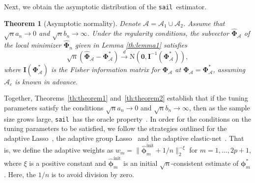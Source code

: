 \documentclass[a4paper,fleqn]{cas-sc}
\newtheorem{theorem}{Theorem}
\newcommand{\sail}{\texttt{sail}}
\newcommand{\A}{\mathcal{A}}
\begin{document}
{\normalsize{}Next, we obtain the asymptotic distribution of the
	\sail ~estimator.}{\normalsize\par}




{\normalsize{}\begin{theorem}[Asymptotic normality] \label{th:theorem2}
		Denote $\mathcal{A}=\A_{1}\cup\A_{2}$. Assume that $\sqrt{n}a_{n}\rightarrow0$
		and $\sqrt{n}b_{n}\to\infty$. Under the regularity conditions, the
		subvector $\widehat{\boldsymbol{\Phi}}_{\A}$ of the local minimizer
		$\widehat{\boldsymbol{\Phi}}_{n}$ given in Lemma \eqref{th:lemma1}
		satisfies 
		\begin{equation}
		\sqrt{n}\left(\widehat{\boldsymbol{\Phi}}_{\A}-\boldsymbol{\Phi}_{\A}^{*}\right)\stackrel{d}{\rightarrow}\mathrm{N}\left(\mathbf{0},\mathbf{I}^{-1}\left(\boldsymbol{\Phi}_{\A}^{*}\right)\right),
		\end{equation}
		where $\mathbf{\mathbf{I}}\left(\boldsymbol{\Phi}_{\A}^{*}\right)$
		is the Fisher information matrix for $\boldsymbol{\Phi}_{\A}$ at
		$\boldsymbol{\Phi}_{\A}=\boldsymbol{\Phi}_{\A}^{*}$, assuming $\A_{c}$
		is known in advance. \end{theorem} }{\normalsize\par}

{\normalsize{}Together, Theorems~\eqref{th:theorem1}
	and~\eqref{th:theorem2} establish that if the tuning parameters
	satisfy the conditions $\sqrt{n}a_{n}\rightarrow0$ and $\sqrt{n}b_{n}\to\infty$,
	then as the sample size grows large, \sail ~has the oracle property~\citep{fan2001variable}.
	In order for the conditions on the tuning parameters to be satisfied,
	we follow the strategies outlined for the adaptive Lasso~\citep{zou2006adaptive},
	the adaptive group Lasso~\citep{nardi2008asymptotic} and the adaptive
	elastic-net~\citep{zou2009adaptive}. That is, we define the adaptive
	weights as $w_{m}=\|\widehat{\boldsymbol{\phi}}_{m}^{\text{init}}+1/n\|_{2}^{-\xi}$
	for $m=1,\ldots,2p+1$, where $\xi$ is a positive constant and $\widehat{\boldsymbol{\phi}}_{m}^{\text{init}}$
	is an initial $\sqrt{n}$-consistent estimate of $\boldsymbol{\phi}_{m}^{*}$.
	Here, the $1/n$ is to avoid division by zero. }{\normalsize\par}
\end{document}
